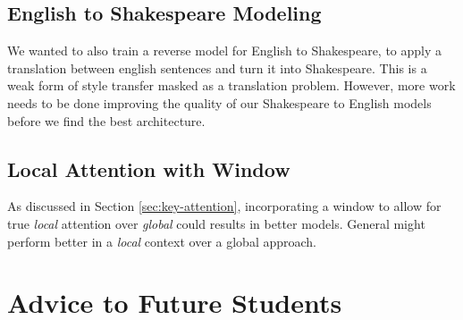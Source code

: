 \documentclass[twoside,twocolumn]{article}
\begin{document}
\subsection{English to Shakespeare Modeling}
We wanted to also train a reverse model for English to Shakespeare, to apply
a translation between english sentences and turn it into Shakespeare. This
is a weak form of style transfer masked as a translation problem. However, more
work needs to be done improving the quality of our Shakespeare to English models
before we find the best architecture.
\subsection{Local Attention with Window}
As discussed in Section \ref{sec:key-attention}, incorporating a window to allow
for true \emph{local} attention over \emph{global} could results in better
models. General might perform better in a \emph{local} context over a global
approach.
\section{Advice to Future Students}
\label{sec:advice}






\clearpage
\appendix
\onecolumn
\end{document}
